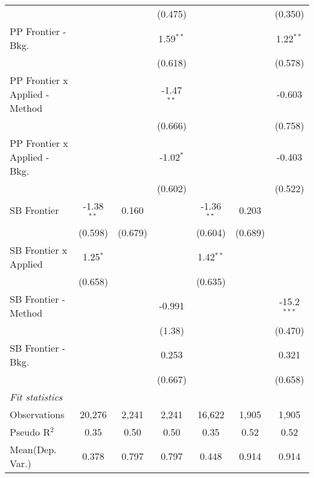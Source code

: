 \begin{tabular}{lcccccc}
                                  &                &               & (0.475)       &                &               & (0.350)\\   
   PP Frontier - Bkg.             &                &               & 1.59$^{**}$   &                &               & 1.22$^{**}$\\   
                                  &                &               & (0.618)       &                &               & (0.578)\\   
   PP Frontier x Applied - Method &                &               & -1.47$^{**}$  &                &               & -0.603\\   
                                  &                &               & (0.666)       &                &               & (0.758)\\   
   PP Frontier x Applied - Bkg.   &                &               & -1.02$^{*}$   &                &               & -0.403\\   
                                  &                &               & (0.602)       &                &               & (0.522)\\   
   SB Frontier                    & -1.38$^{**}$   & 0.160         &               & -1.36$^{**}$   & 0.203         &   \\   
                                  & (0.598)        & (0.679)       &               & (0.604)        & (0.689)       &   \\   
   SB Frontier x Applied          & 1.25$^{*}$     &               &               & 1.42$^{**}$    &               &   \\   
                                  & (0.658)        &               &               & (0.635)        &               &   \\   
   SB Frontier - Method           &                &               & -0.991        &                &               & -15.2$^{***}$\\   
                                  &                &               & (1.38)        &                &               & (0.470)\\   
   SB Frontier - Bkg.             &                &               & 0.253         &                &               & 0.321\\   
                                  &                &               & (0.667)       &                &               & (0.658)\\   
   \midrule
   \emph{Fit statistics}\\
   Observations                   & 20,276         & 2,241         & 2,241         & 16,622         & 1,905         & 1,905\\  
   Pseudo R$^2$                   & 0.35           & 0.50          & 0.50          & 0.35           & 0.52          & 0.52\\  
Mean(Dep. Var.) & 0.378 & 0.797 & 0.797 & 0.448 & 0.914 & 0.914 \\
   

\end{tabular}
